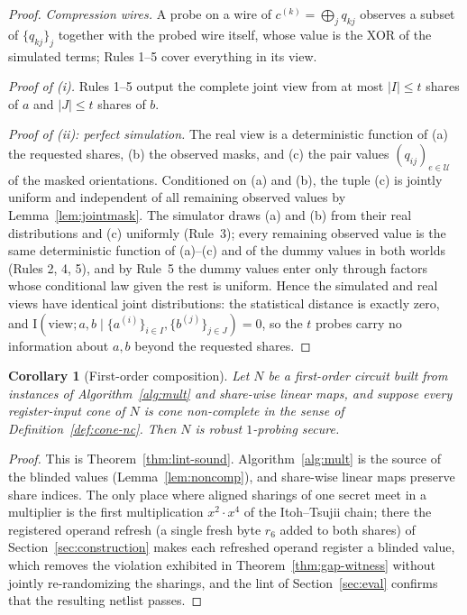 \documentclass[lettersize,journal]{IEEEtran}
\newtheorem{corollary}{Corollary}
\newcommand{\share}[2]{#1^{(#2)}}
\begin{document}
\begin{proof}
\emph{Compression wires.} A probe on a wire of $\share{c}{k}=\bigoplus_j
q_{kj}$ observes a subset of $\{q_{kj}\}_j$ together with the probed
wire itself, whose value is the XOR of the simulated terms; Rules 1--5
cover everything in its view.

\emph{Proof of (i).} Rules 1--5 output the complete joint view from at
most $|I|\le t$ shares of $a$ and $|J|\le t$ shares of $b$.

\emph{Proof of (ii): perfect simulation.} The real view is a
deterministic function of (a) the requested shares, (b) the observed
masks, and (c) the pair values $(q_{ij})_{e\in\mathcal{U}}$ of the masked
orientations. Conditioned on (a) and (b), the tuple (c) is jointly
uniform and independent of all remaining observed values by
Lemma~\ref{lem:jointmask}. The simulator draws (a) and (b) from their
real distributions and (c) uniformly (Rule~3); every remaining observed
value is the same deterministic function of (a)--(c) and of the dummy
values in both worlds (Rules 2, 4, 5), and by Rule~5 the dummy values
enter only through factors whose conditional law given the rest is
uniform. Hence the simulated and real views have identical joint
distributions: the statistical distance is exactly zero, and
$\mathrm{I}(\mathrm{view};a,b\mid\{\share{a}{i}\}_{i\in I},
\{\share{b}{j}\}_{j\in J})=0$, so the $t$ probes carry no information
about $a,b$ beyond the requested shares.
\end{proof}

\begin{corollary}[First-order composition]
\label{cor:comp}
Let $N$ be a first-order circuit built from instances of
Algorithm~\ref{alg:mult} and share-wise linear maps, and suppose every
register-input cone of $N$ is cone non-complete in the sense of
Definition~\ref{def:cone-nc}. Then $N$ is robust $1$-probing secure.
\end{corollary}
\begin{proof}
This is Theorem~\ref{thm:lint-sound}. Algorithm~\ref{alg:mult} is the source of
the blinded values (Lemma~\ref{lem:noncomp}), and share-wise linear maps
preserve share indices. The only place where aligned sharings of one secret
meet in a multiplier is the first multiplication $x^{2}{\cdot}x^{4}$ of the
Itoh--Tsujii chain; there the registered operand refresh (a single fresh byte $r_6$ added to both
shares) of Section~\ref{sec:construction} makes each refreshed operand
register a blinded value, which removes the violation exhibited in
Theorem~\ref{thm:gap-witness} without jointly re-randomizing the
sharings, and the lint of
Section~\ref{sec:eval} confirms that the resulting netlist passes.
\end{proof}
\end{document}
